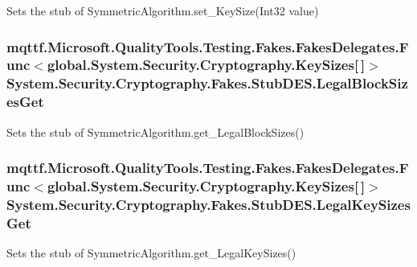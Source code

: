 Sets the stub of Symmetric\-Algorithm.\-set\-\_\-\-Key\-Size(\-Int32 value)

\hypertarget{class_system_1_1_security_1_1_cryptography_1_1_fakes_1_1_stub_d_e_s_a5b585be0f93296275d8d7f36224b00bd}{
\subsubsection[{Legal\-Block\-Sizes\-Get}]{\setlength{\rightskip}{0pt plus 5cm}mqttf.\-Microsoft.\-Quality\-Tools.\-Testing.\-Fakes.\-Fakes\-Delegates.\-Func$<$global.\-System.\-Security.\-Cryptography.\-Key\-Sizes\mbox{[}$\,$\mbox{]}$>$ System.\-Security.\-Cryptography.\-Fakes.\-Stub\-D\-E\-S.\-Legal\-Block\-Sizes\-Get}}\label{class_system_1_1_security_1_1_cryptography_1_1_fakes_1_1_stub_d_e_s_a5b585be0f93296275d8d7f36224b00bd}


Sets the stub of Symmetric\-Algorithm.\-get\-\_\-\-Legal\-Block\-Sizes()

\hypertarget{class_system_1_1_security_1_1_cryptography_1_1_fakes_1_1_stub_d_e_s_a0c15ff6365fc8a2740756d1e9f7df8f6}{
\subsubsection[{Legal\-Key\-Sizes\-Get}]{\setlength{\rightskip}{0pt plus 5cm}mqttf.\-Microsoft.\-Quality\-Tools.\-Testing.\-Fakes.\-Fakes\-Delegates.\-Func$<$global.\-System.\-Security.\-Cryptography.\-Key\-Sizes\mbox{[}$\,$\mbox{]}$>$ System.\-Security.\-Cryptography.\-Fakes.\-Stub\-D\-E\-S.\-Legal\-Key\-Sizes\-Get}}\label{class_system_1_1_security_1_1_cryptography_1_1_fakes_1_1_stub_d_e_s_a0c15ff6365fc8a2740756d1e9f7df8f6}


Sets the stub of Symmetric\-Algorithm.\-get\-\_\-\-Legal\-Key\-Sizes()

